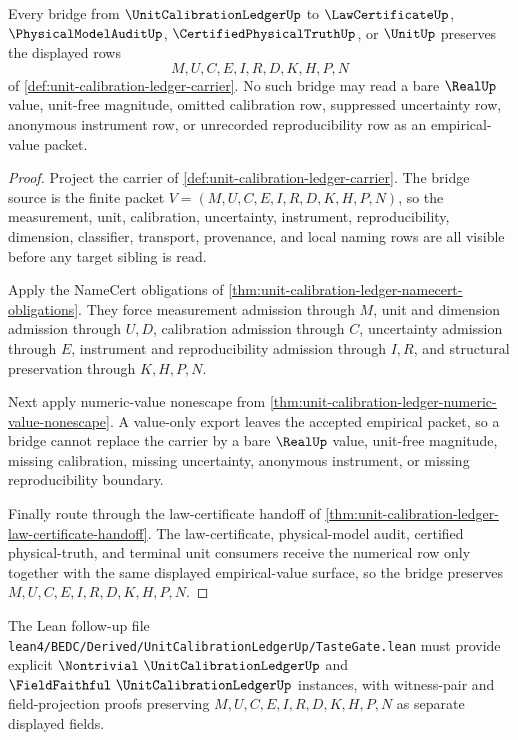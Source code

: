 \begin{theorem}
\label{thm:unit-calibration-ledger-empirical-bridge-surface}
Every bridge from $\UnitCalibrationLedgerUp$ to $\LawCertificateUp$, $\PhysicalModelAuditUp$, $\CertifiedPhysicalTruthUp$, or $\UnitUp$ preserves the displayed rows
$$
M,U,C,E,I,R,D,K,H,P,N
$$
of \autoref{def:unit-calibration-ledger-carrier}. No such bridge may read a bare $\RealUp$ value, unit-free magnitude, omitted calibration row, suppressed uncertainty row, anonymous instrument row, or unrecorded reproducibility row as an empirical-value packet.
\end{theorem}
\begin{proof}
Project the carrier of \autoref{def:unit-calibration-ledger-carrier}. The bridge source is the finite packet $V=(M,U,C,E,I,R,D,K,H,P,N)$, so the measurement, unit, calibration, uncertainty, instrument, reproducibility, dimension, classifier, transport, provenance, and local naming rows are all visible before any target sibling is read.

Apply the NameCert obligations of \autoref{thm:unit-calibration-ledger-namecert-obligations}. They force measurement admission through $M$, unit and dimension admission through $U,D$, calibration admission through $C$, uncertainty admission through $E$, instrument and reproducibility admission through $I,R$, and structural preservation through $K,H,P,N$.

Next apply numeric-value nonescape from \autoref{thm:unit-calibration-ledger-numeric-value-nonescape}. A value-only export leaves the accepted empirical packet, so a bridge cannot replace the carrier by a bare $\RealUp$ value, unit-free magnitude, missing calibration, missing uncertainty, anonymous instrument, or missing reproducibility boundary.

Finally route through the law-certificate handoff of \autoref{thm:unit-calibration-ledger-law-certificate-handoff}. The law-certificate, physical-model audit, certified physical-truth, and terminal unit consumers receive the numerical row only together with the same displayed empirical-value surface, so the bridge preserves $M,U,C,E,I,R,D,K,H,P,N$.
\end{proof}

The Lean follow-up file \texttt{lean4/BEDC/Derived/UnitCalibrationLedgerUp/TasteGate.lean} must provide explicit $\Nontrivial\ \UnitCalibrationLedgerUp$ and $\FieldFaithful\ \UnitCalibrationLedgerUp$ instances, with witness-pair and field-projection proofs preserving $M,U,C,E,I,R,D,K,H,P,N$ as separate displayed fields.

